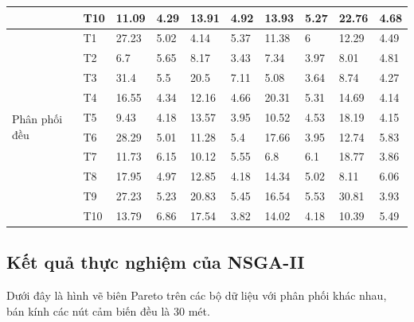 \documentclass{hust}
\begin{document}
\begin{center}
\begin{table}[!htbp]
\begin{adjustwidth}{-1.8cm}{}
\begin{tabular}{|l|l|l|l|l|l|l|l|l|l|}
	&T10	&11.09	&4.29	&13.91	&4.92	&13.93	&5.27	&22.76	&4.68	\\ \hline
	\multirow{10}{*}{Phân phối đều}      
	&T1	&27.23	&5.02	&4.14	&5.37	&11.38	&6	&12.29	&4.49	\\
	&T2	&6.7	&5.65	&8.17	&3.43	&7.34	&3.97	&8.01	&4.81	\\
	&T3	&31.4	&5.5	&20.5	&7.11	&5.08	&3.64	&8.74	&4.27	\\
	&T4	&16.55	&4.34	&12.16	&4.66	&20.31	&5.31	&14.69	&4.14	\\
	&T5	&9.43	&4.18	&13.57	&3.95	&10.52	&4.53	&18.19	&4.15	\\
	&T6	&28.29	&5.01	&11.28	&5.4	&17.66	&3.95	&12.74	&5.83	\\
	&T7	&11.73	&6.15	&10.12	&5.55	&6.8	&6.1	&18.77	&3.86	\\
	&T8	&17.95	&4.97	&12.85	&4.18	&14.34	&5.02	&8.11	&6.06	\\
	&T9	&27.23	&5.23	&20.83	&5.45	&16.54	&5.53	&30.81	&3.93	\\
	&T10	&13.79	&6.86	&17.54	&3.82	&14.02	&4.18	&10.39	&5.49	\\ \hline
\end{tabular}
\end{adjustwidth}
\end{table}
\end{center}

\subsection{Kết quả thực nghiệm của \gls{NSGA-II}}
Dưới đây là hình vẽ biên Pareto trên các bộ dữ liệu với phân phối khác nhau, bán kính các nút cảm biến đều là 30 mét.
\end{document}
